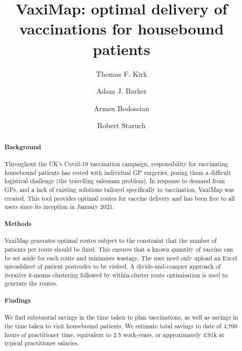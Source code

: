 \documentclass[review]{elsarticle}
\def\vm{VaxiMap}
\begin{document}
\begin{frontmatter}

\title{\vm{}{}: optimal delivery of vaccinations for housebound patients}


\address[IBME]{Institute of Biomedical Engineering, Department of Engineering Science, University of Oxford, Oxford}

\address[Sqpt]{Squarepoint Capital LLP, London}
\address[Vod]{Vodafone Group PLC, London}
\address[DMS]{Defence Deanery, Academic Department of Military Surgery and Trauma, Birmingham}

\author[IBME]{Thomas F. Kirk}

\author[Sqpt]{Adam J. Barker}
\author[Vod]{Armen Bodossian}
\author[IBME,DMS]{Robert Staruch}

\begin{abstract}
\paragraph{Background} Throughout the UK's Covid-19 vaccination campaign, responsibility for vaccinating housebound patients has rested with individual GP surgeries, posing them a difficult logistical challenge (the travelling salesman problem). In response to demand from GPs, and a lack of existing solutions tailored specifically to vaccination, \vm{} was created. This tool provides optimal routes for vaccine delivery and has been free to all users since its inception in January 2021. 

\paragraph{Methods} \vm{} generates optimal routes subject to the constraint that the number of patients per route should be fixed. This ensures that a known quantity of vaccine can be set aside for each route and minimises wastage. The user need only upload an Excel spreadsheet of patient postcodes to be visited. A divide-and-conquer approach of iterative $k$-means clustering followed by within-cluster route optimisation is used to generate the routes. 

\paragraph{Findings} We find substantial savings in the time taken to plan vaccinations, as well as savings in the time taken to visit housebound patients. We estimate total savings to date of 4,700 hours of practitioner time, equivalent to 2.5 work-years, or approximately £91k at typical practitioner salaries. 


\end{abstract}
\end{frontmatter}
\end{document}
